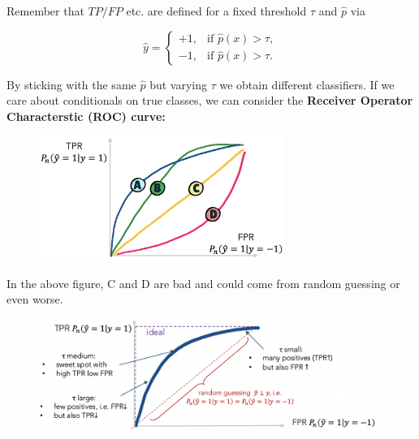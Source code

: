 \documentclass[a4paper]{extarticle}
\begin{document}
Remember that \(TP/FP\) etc. are defined for a fixed threshold \(\tau\) and \(\hat{p}\) via

\[
    \hat{y} = \begin{cases}
        +1, &\text{if } \hat{p}(x) > \tau, \\
        -1, &\text{if } \hat{p}(x) > \tau.
    \end{cases}
\]

By sticking with the same \(\hat{p}\) but varying \(\tau\) we obtain different classifiers. If we care about conditionals on true classes, we can consider the \textbf{Receiver Operator Characterstic (ROC) curve:}

\begin{figure}[H]
    \includegraphics[width=8cm]{../images/IntroML_Fig4-18}
    \centering
\end{figure}

In the above figure, C and D are bad and could come from random guessing or even worse. 

\begin{figure}[H]
    \includegraphics[width=11cm]{../images/IntroML_Fig4-19}
    \centering
\end{figure}
\end{document}
